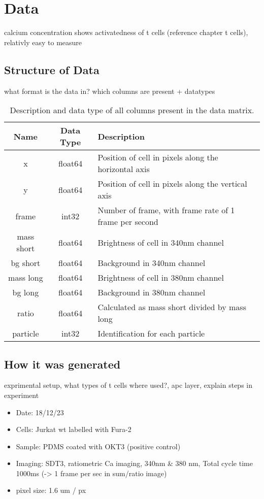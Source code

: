 \chapter{Data}
\label{chapter:data}

calcium concentration shows activatedness of t cells (reference chapter t cells), relativly easy to measure

\section{Structure of Data}

what format is the data in? which columns are present + datatypes

\begin{table}[h!]
	\centering
	\begin{tabular}{|c|c|l|}
		\hline
		\textbf{Name} & \textbf{Data Type} & \textbf{Description} \\
		\hline
		x & float64 & Position of cell in pixels along the horizontal axis \\
		\hline
		y & float64 & Position of cell in pixels along the vertical axis \\
		\hline
		frame & int32 & Number of frame, with frame rate of 1 frame per second \\
		\hline
		mass short & float64 & Brightness of cell in 340nm channel \\
		\hline
		bg short & float64 & Background in 340nm channel \\
		\hline
		mass long & float64 & Brightness of cell in 380nm channel \\
		\hline
		bg long & float64 & Background in 380nm channel \\
		\hline
		ratio & float64 & Calculated as mass short divided by mass long \\
		\hline
		particle & int32 & Identification for each particle \\
		\hline
	\end{tabular}
	\caption{Description and data type of all columns present in the data matrix.}
\end{table}


\section{How it was generated}

exprimental setup, what types of t cells where used?, apc layer, explain steps in experiment

\begin{itemize}
	\item Date: 18/12/23
	\item Cells:  Jurkat wt labelled with Fura-2
	\item Sample: PDMS coated with OKT3 (positive control)
	\item Imaging: SDT3, ratiometric Ca imaging, 340nm \& 380 nm, Total cycle time 1000ms (-> 1 frame per sec in sum/ratio image)
	\item pixel size: 1.6 um / px
\end{itemize}


